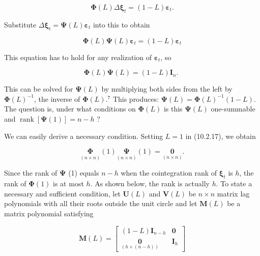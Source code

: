 \documentclass[10pt]{article}
\begin{document}
\begin{equation*}
\mathbf{\Phi}(L) \Delta \boldsymbol{\xi}_{t}=(1-L) \boldsymbol{\varepsilon}_{t} . \tag{10.2.15}
\end{equation*}


Substitute $\Delta \boldsymbol{\xi}_{t}=\boldsymbol{\Psi}(L) \boldsymbol{\varepsilon}_{t}$ into this to obtain


\begin{equation*}
\boldsymbol{\Phi}(L) \boldsymbol{\Psi}(L) \boldsymbol{\varepsilon}_{t}=(1-L) \boldsymbol{\varepsilon}_{t} \tag{10.2.16}
\end{equation*}


This equation has to hold for any realization of $\boldsymbol{\varepsilon}_{t}$, so


\begin{equation*}
\boldsymbol{\Phi}(L) \boldsymbol{\Psi}(L)=(1-L) \mathbf{I}_{n} \text {. } \tag{10.2.17}
\end{equation*}


This can be solved for $\boldsymbol{\Psi}(L)$ by multiplying both sides from the left by $\boldsymbol{\Phi}(L)^{-1}$, the inverse of $\boldsymbol{\Phi}(L) .^{7}$ This produces: $\boldsymbol{\Psi}(L)=\boldsymbol{\Phi}(L)^{-1}(1-L)$. The question is, under what conditions on $\boldsymbol{\Phi}(L)$ is this $\boldsymbol{\Psi}(L)$ one-summable and $\operatorname{rank}[\boldsymbol{\Psi}(1)]=n-h$ ?

We can easily derive a necessary condition. Setting $L=1$ in (10.2.17), we obtain


\begin{equation*}
\underset{(n \times n)}{\boldsymbol{\Phi}}(1) \underset{(n \times n)}{\boldsymbol{\Psi}}(1)=\underset{(n \times n)}{\mathbf{0}} . \tag{10.2.18}
\end{equation*}


Since the rank of $\boldsymbol{\Psi}$ (1) equals $n-h$ when the cointegration rank of $\boldsymbol{\xi}_{t}$ is $h$, the rank of $\boldsymbol{\Phi}(1)$ is at most $h$. As shown below, the rank is actually $h$. To state a necessary and sufficient condition, let $\mathbf{U}(L)$ and $\mathbf{V}(L)$ be $n \times n$ matrix lag polynomials with all their roots outside the unit circle and let $\mathbf{M}(L)$ be a matrix polynomial satisfying

\[
\mathbf{M}(L)=\left[\begin{array}{cc}
(1-L) \mathbf{I}_{n-h} & \mathbf{0}  \tag{10.2.19}\\
\underset{(h \times(n-h))}{\mathbf{0}} & \mathbf{I}_{h}
\end{array}\right]
\]
\end{document}
